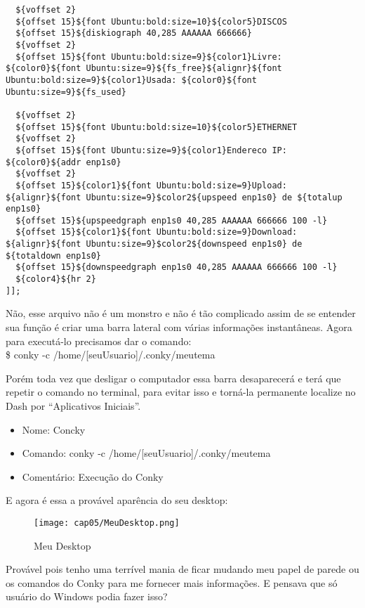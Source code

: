 \begin{lstlisting}
  ${voffset 2}
  ${offset 15}${font Ubuntu:bold:size=10}${color5}DISCOS
  ${offset 15}${diskiograph 40,285 AAAAAA 666666}
  ${voffset 2}
  ${offset 15}${font Ubuntu:bold:size=9}${color1}Livre: ${color0}${font Ubuntu:size=9}${fs_free}${alignr}${font Ubuntu:bold:size=9}${color1}Usada: ${color0}${font Ubuntu:size=9}${fs_used}

  ${voffset 2}
  ${offset 15}${font Ubuntu:bold:size=10}${color5}ETHERNET
  ${voffset 2}   
  ${offset 15}${font Ubuntu:size=9}${color1}Endereco IP: ${color0}${addr enp1s0}          
  ${voffset 2}   
  ${offset 15}${color1}${font Ubuntu:bold:size=9}Upload: ${alignr}${font Ubuntu:size=9}$color2${upspeed enp1s0} de ${totalup enp1s0}
  ${offset 15}${upspeedgraph enp1s0 40,285 AAAAAA 666666 100 -l}
  ${offset 15}${color1}${font Ubuntu:bold:size=9}Download: ${alignr}${font Ubuntu:size=9}$color2${downspeed enp1s0} de ${totaldown enp1s0}
  ${offset 15}${downspeedgraph enp1s0 40,285 AAAAAA 666666 100 -l}
  ${color4}${hr 2}
]];
\end{lstlisting}

Não, esse arquivo não é um monstro e não é tão complicado assim de se entender sua função é criar uma barra lateral com várias informações instantâneas. Agora para executá-lo precisamos dar o comando: \\
{\ttfamily\$ conky -c /home/[seuUsuario]/.conky/meutema}

Porém toda vez que desligar o computador essa barra desaparecerá e terá que repetir o comando no terminal, para evitar isso e torná-la permanente localize no Dash por ``Aplicativos Iniciais''. \vspace{-1em}
\begin{itemize}[noitemsep]
 \item Nome: Concky
 \item Comando: conky -c /home/[seuUsuario]/.conky/meutema
 \item Comentário: Execução do Conky
\end{itemize}

E agora é essa a provável aparência do seu desktop:
\begin{figure}[H]
	\centering\texttt{[image: cap05/MeuDesktop.png]}
	\caption{Meu Desktop}
\end{figure}

Provável pois tenho uma terrível mania de ficar mudando meu papel de parede ou os comandos do Conky para me fornecer mais informações. E pensava que só usuário do Windows podia fazer isso?

\clearpage